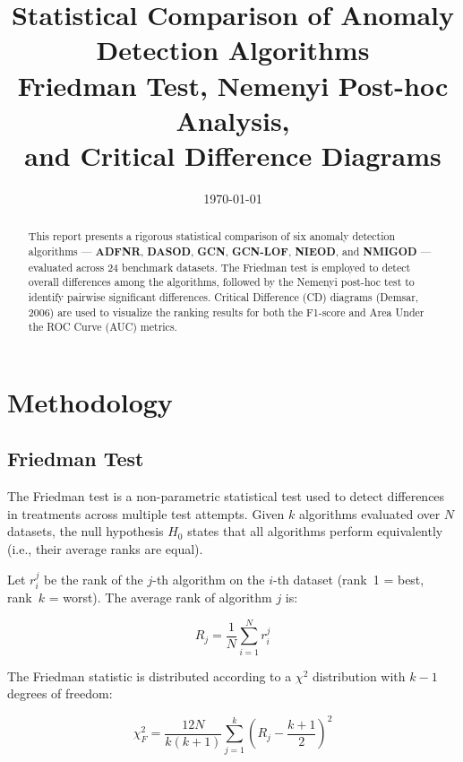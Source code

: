 \documentclass[11pt,a4paper]{article}
\title{\textbf{Statistical Comparison of Anomaly Detection Algorithms}\\[6pt]
       \large Friedman Test, Nemenyi Post-hoc Analysis, \\
              and Critical Difference Diagrams}
\author{}
\date{\today}
\begin{document}
\maketitle
\thispagestyle{empty}

\begin{abstract}
\noindent
This report presents a rigorous statistical comparison of six anomaly detection
algorithms — \textbf{ADFNR}, \textbf{DASOD}, \textbf{GCN}, \textbf{GCN-LOF},
\textbf{NIEOD}, and \textbf{NMIGOD} — evaluated across 24 benchmark datasets.
The Friedman test is employed to detect overall differences among the algorithms,
followed by the Nemenyi post-hoc test to identify pairwise significant differences.
Critical Difference (CD) diagrams (Demsar, 2006) are used to visualize the
ranking results for both the F1-score and Area Under the ROC Curve (AUC) metrics.
\end{abstract}

\vspace{12pt}

\section{Methodology}

\subsection{Friedman Test}

The Friedman test is a non-parametric statistical test used to detect differences
in treatments across multiple test attempts. Given $k$ algorithms evaluated over
$N$ datasets, the null hypothesis $H_0$ states that all algorithms perform
equivalently (i.e., their average ranks are equal).

Let $r_i^j$ be the rank of the $j$-th algorithm on the $i$-th dataset
(rank~1 = best, rank~$k$ = worst). The average rank of algorithm $j$ is:

\begin{equation}
R_j = \frac{1}{N} \sum_{i=1}^{N} r_i^j
\end{equation}

The Friedman statistic is distributed according to a $\chi^2$ distribution
with $k-1$ degrees of freedom:

\begin{equation}
\chi_F^2 = \frac{12N}{k(k+1)} \sum_{j=1}^{k} \left( R_j - \frac{k+1}{2} \right)^2
\end{equation}
\end{document}
